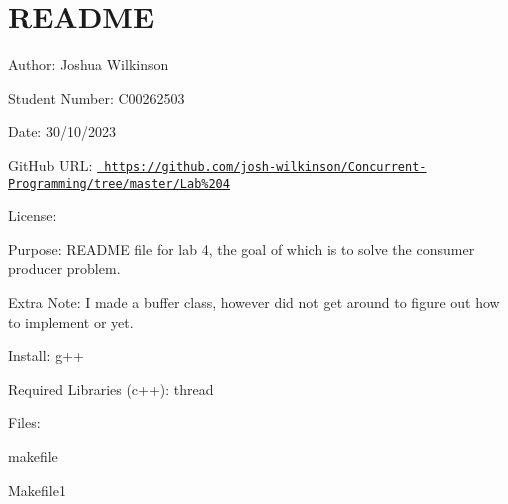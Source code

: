 \chapter{README}
\hypertarget{md__r_e_a_d_m_e}{}\label{md__r_e_a_d_m_e}
\label{md__r_e_a_d_m_e_autotoc_md0}%
%
 Author\+: Joshua Wilkinson

Student Number\+: C00262503

Date\+: 30/10/2023

Git\+Hub URL\+: \href{https://github.com/josh-wilkinson/Concurrent-Programming/tree/master/Lab\%204}{\texttt{ https\+://github.\+com/josh-\/wilkinson/\+Concurrent-\/\+Programming/tree/master/\+Lab\%204}}

License\+: 

Purpose\+: README file for lab 4, the goal of which is to solve the consumer producer problem.

Extra Note\+: I made a buffer class, however did not get around to figure out how to implement  or  yet.

Install\+: g++

Required Libraries (c++)\+: thread

Files\+:
\begin{DoxyItemize}
\item makefile
\item {}
\item {}
\item {}
\item Makefile1
\item {} 
\end{DoxyItemize}